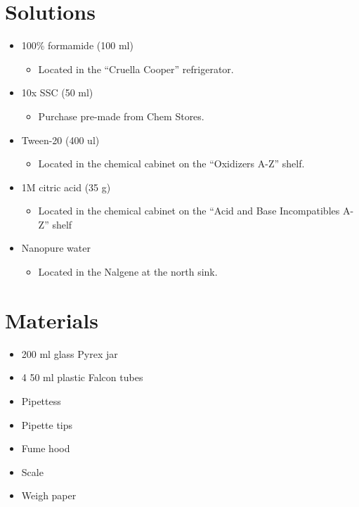 \documentclass[
  letterpaper,
  DIV=11,
  numbers=noendperiod]{scrreprt}
\providecommand{\tightlist}{%
  \setlength{\itemsep}{0pt}\setlength{\parskip}{0pt}}\usepackage{longtable,booktabs,array}
\begin{document}
\hypertarget{solutions-86}{%
\section{Solutions}\label{solutions-86}}

\begin{itemize}
\tightlist
\item
  100\% formamide (100 ml)

  \begin{itemize}
  \tightlist
  \item
    Located in the ``Cruella Cooper'' refrigerator.
  \end{itemize}
\item
  10x SSC (50 ml)

  \begin{itemize}
  \tightlist
  \item
    Purchase pre-made from Chem Stores.
  \end{itemize}
\item
  Tween-20 (400 ul)

  \begin{itemize}
  \tightlist
  \item
    Located in the chemical cabinet on the ``Oxidizers A-Z'' shelf.
  \end{itemize}
\item
  1M citric acid (35 g)

  \begin{itemize}
  \tightlist
  \item
    Located in the chemical cabinet on the ``Acid and Base Incompatibles
    A-Z'' shelf
  \end{itemize}
\item
  Nanopure water

  \begin{itemize}
  \tightlist
  \item
    Located in the Nalgene at the north sink.
  \end{itemize}
\end{itemize}

\hypertarget{materials-95}{%
\section{Materials}\label{materials-95}}

\begin{itemize}
\tightlist
\item
  200 ml glass Pyrex jar
\item
  4 50 ml plastic Falcon tubes
\item
  Pipettess
\item
  Pipette tips
\item
  Fume hood
\item
  Scale
\item
  Weigh paper
\end{itemize}
\end{document}
